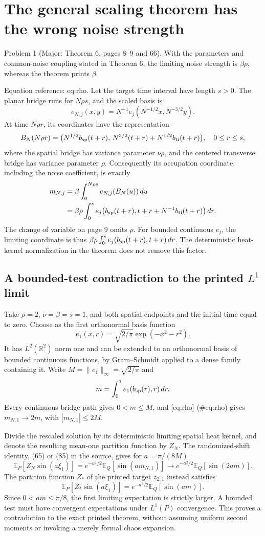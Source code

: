 \documentclass[10pt]{article}
\begin{document}
\section*{The general scaling theorem has the wrong noise strength}
Problem 1 (Major: Theorem 6, pages 8–9 and 66).  With the parameters and common-noise coupling stated in Theorem 6, the limiting noise strength is \(\beta\rho\), whereas the theorem prints \(\beta\).\par
Equation reference: eq:rho. Let the target time interval have length \(s>0\). The planar bridge runs for \(N\rho s\), and the scaled basis is \[e_{N,j}(x,y)=N^{-1}e_j(N^{-1/2}x,N^{-3/2}y).\] At time \(N\rho r\), its coordinates have the representation \[B_N(N\rho r)=
 \bigl(N^{1/2}b_{\rm sp}(t+r),\,
       N^{3/2}(t+r)+N^{1/2}b_{\rm ti}(t+r)\bigr),
 \quad 0\le r\le s,\] where the spatial bridge has variance parameter \(\nu\rho\), and the centered transverse bridge has variance parameter \(\rho\). Consequently its occupation coordinate, including the noise coefficient, is exactly \[\begin{aligned}
 m_{N,j}
 &=\beta\int_0^{N\rho s} e_{N,j}(B_N(u))\,du \notag\\
 &=\beta\rho\int_0^s
 e_j\bigl(b_{\rm sp}(t+r),t+r+N^{-1}b_{\rm ti}(t+r)\bigr)\,dr.
 \end{aligned}\] The change of variable on page 9 omits \(\rho\). For bounded continuous \(e_j\), the limiting coordinate is thus \(\beta\rho\int_0^s e_j(b_{\rm sp}(t+r),t+r)\,dr\). The deterministic heat-kernel normalization in the theorem does not remove this factor.\par
\subsection*{A bounded-test contradiction to the printed \(L^1\) limit}
Take \(\rho=2\), \(\nu=\beta=s=1\), and both spatial endpoints and the initial time equal to zero. Choose as the first orthonormal basis function \[e_1(x,r)=\sqrt{2/\pi}\exp(-x^2-r^2).\] It has \(L^2(\mathbb R^2)\) norm one and can be extended to an orthonormal basis of bounded continuous functions, by Gram–Schmidt applied to a dense family containing it. Write \(M=\|e_1\|_\infty=\sqrt{2/\pi}\) and \[m=\int_0^1 e_1(b_{\rm sp}(r),r)\,dr.\] Every continuous bridge path gives \(0<m\le M\), and [eq:rho] (\#eq:rho) gives \(m_{N,1}\to2m\), with \(|m_{N,1}|\le2M\).\par
Divide the rescaled solution by its deterministic limiting spatial heat kernel, and denote the resulting mean-one partition function by \(Z_N\). The randomized-shift identity, (65) or (85) in the source, gives for \(a=\pi/(8M)\) \[\mathbb E_P[Z_N\sin(a\xi_1)]
 =e^{-a^2/2}\mathbb E_Q[\sin(a m_{N,1})]
 \longrightarrow e^{-a^2/2}\mathbb E_Q[\sin(2am)].\] The partition function \(Z_*\) of the printed target \(z_{2,1}\) instead satisfies \[\mathbb E_P[Z_*\sin(a\xi_1)]
 =e^{-a^2/2}\mathbb E_Q[\sin(am)].\] Since \(0<am\le\pi/8\), the first limiting expectation is strictly larger. A bounded test must have convergent expectations under \(L^1(P)\) convergence. This proves a contradiction to the exact printed theorem, without assuming uniform second moments or invoking a merely formal chaos expansion.\par
\end{document}
